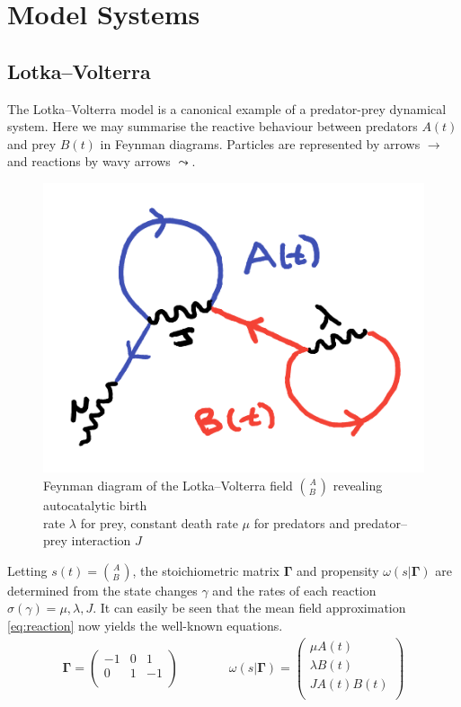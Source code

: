 \documentclass{article}[12pt]
\numberwithin{equation}{section}
\begin{document}
\pagebreak
\section{Model Systems}\vspace{-10pt}
\subsection{Lotka--Volterra}\vspace{-10pt}
The Lotka--Volterra model is a canonical example of a predator-prey dynamical
system. Here we may summarise the reactive behaviour between predators $A(t)$
and prey $B(t)$ in Feynman diagrams. Particles are represented by arrows
$\rightarrow$ and reactions by wavy arrows $\leadsto$.
\begin{figure}[H]
\centering{}
\captionsetup{justification=centering}
\includegraphics[scale=0.4]{figures/lotkavolterrafield}
\caption{Feynman diagram of the Lotka--Volterra field ${A\choose B\,}$  revealing
autocatalytic birth \\ rate $\lambda$ for prey, constant death rate $\mu$ for predators
and predator--prey interaction $J$}
\label{fig:lotkavolterrafield}
\end{figure}
Letting $s(t)={A\choose B\,}$, the stoichiometric matrix $\mathbf{\Gamma}$ and
propensity $\omega(s|\mathbf{\Gamma})$ are determined from the state changes
$\gamma$ and the rates of each reaction $\sigma(\gamma)=\mu,\lambda,J$. It
can easily be seen that the mean field approximation \eqref{eq:reaction}
now yields the well-known equations.
\begin{align}
	\mathbf{\Gamma}=
	\begin{pmatrix}
		-1 & 0 & 1 \\
		0 & 1 & -1 \\
	\end{pmatrix}
	\qquad\qquad
	\omega(s|\mathbf{\Gamma})=
	\begin{pmatrix}
	  \mu A(t)\\
		\lambda B(t)  \\
		J A(t)B(t) \\
	\end{pmatrix}
\end{align}
\end{document}
